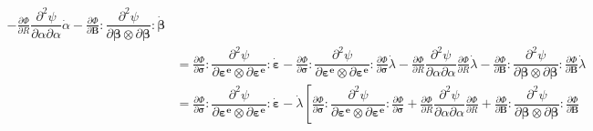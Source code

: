 \documentclass[]{scrartcl}
\begin{document}
\begin{easylist}
\begin{align*}
  - \frac{\partial \Phi}{\partial R} \dfrac{\partial^{2} \psi}{\partial \alpha \partial \alpha} \dot{\alpha}
  - \frac{\partial \Phi}{\partial \boldsymbol{B}} : \dfrac{\partial^{2} \psi}{\partial \boldsymbol{\beta} \otimes \partial \boldsymbol{\beta}} : \dot{\boldsymbol{\beta}} \\
 &= \frac{\partial \Phi}{\partial \boldsymbol{\sigma}} : \dfrac{\partial^{2} \psi}{\partial \boldsymbol{\varepsilon^{e}} \otimes \partial \boldsymbol{\varepsilon^{e}}} : \dot{\boldsymbol{\varepsilon}} 
  - \frac{\partial \Phi}{\partial \boldsymbol{\sigma}} : \dfrac{\partial^{2} \psi}{\partial \boldsymbol{\varepsilon^{e}} \otimes \partial \boldsymbol{\varepsilon^{e}}} : \frac{\partial \Phi}{\partial \boldsymbol{\sigma}} \dot{\lambda}
  - \frac{\partial \Phi}{\partial R} \dfrac{\partial^{2} \psi}{\partial \alpha \partial \alpha} \frac{\partial \Phi}{\partial R} \dot{\lambda}
  - \frac{\partial \Phi}{\partial \boldsymbol{B}} : \dfrac{\partial^{2} \psi}{\partial \boldsymbol{\beta} \otimes \partial \boldsymbol{\beta}} : \frac{\partial \Phi}{\partial \boldsymbol{B}}  \dot{\lambda} \\
 &= \frac{\partial \Phi}{\partial \boldsymbol{\sigma}} : \dfrac{\partial^{2} \psi}{\partial \boldsymbol{\varepsilon^{e}} \otimes \partial \boldsymbol{\varepsilon^{e}}} : \dot{\boldsymbol{\varepsilon}} 
  -  \dot{\lambda} \left[ 
  \frac{\partial \Phi}{\partial \boldsymbol{\sigma}} : \dfrac{\partial^{2} \psi}{\partial \boldsymbol{\varepsilon^{e}} \otimes \partial \boldsymbol{\varepsilon^{e}}} : \frac{\partial \Phi}{\partial \boldsymbol{\sigma}}
  + \frac{\partial \Phi}{\partial R} \dfrac{\partial^{2} \psi}{\partial \alpha \partial \alpha} \frac{\partial \Phi}{\partial R}
  + \frac{\partial \Phi}{\partial \boldsymbol{B}} : \dfrac{\partial^{2} \psi}{\partial \boldsymbol{\beta} \otimes \partial \boldsymbol{\beta}} : \frac{\partial \Phi}{\partial \boldsymbol{B}}

\end{align*}
\end{easylist}
\end{document}

